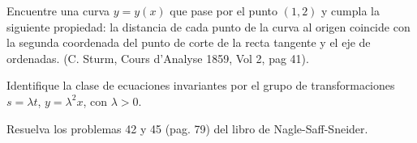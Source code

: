 \begin{ejercicio}
    Encuentre una curva $y = y(x)$ que pase por el punto $(1, 2)$ y cumpla la siguiente propiedad: la distancia de cada punto de la curva al origen coincide con la segunda coordenada del punto de corte de la recta tangente y el eje de ordenadas. (C. Sturm, Cours d’Analyse 1859, Vol 2, pag 41).
\end{ejercicio}

\begin{ejercicio}
    Identifique la clase de ecuaciones invariantes por el grupo de transformaciones $s = \lambda t$, $y = \lambda^2 x$, con $\lambda > 0$.
\end{ejercicio}

\begin{ejercicio}
    Resuelva los problemas 42 y 45 (pag. 79) del libro de Nagle-Saff-Sneider.
\end{ejercicio}